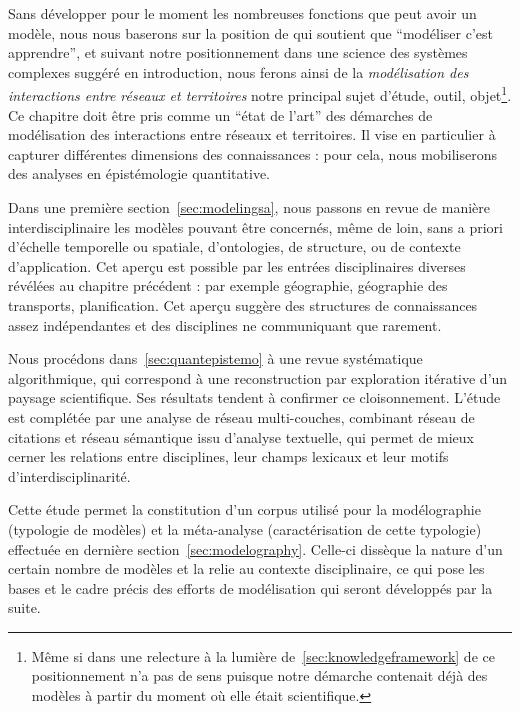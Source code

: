 Sans développer pour le moment les nombreuses fonctions que peut avoir un modèle, nous nous baserons sur la position de  qui soutient que ``modéliser c'est apprendre'', et suivant notre positionnement dans une science des systèmes complexes suggéré en introduction, nous ferons ainsi de la \emph{modélisation des interactions entre réseaux et territoires} notre principal sujet d'étude, outil, objet\footnote{Même si dans une relecture à la lumière de~\ref{sec:knowledgeframework} de ce positionnement n'a pas de sens puisque notre démarche contenait déjà des modèles à partir du moment où elle était scientifique.}. Ce chapitre doit être pris comme un ``état de l'art'' des démarches de modélisation des interactions entre réseaux et territoires. Il vise en particulier à capturer différentes dimensions des connaissances : pour cela, nous mobiliserons des analyses en épistémologie quantitative.


Dans une première section~\ref{sec:modelingsa}, nous passons en revue de manière interdisciplinaire les modèles pouvant être concernés, même de loin, sans a priori d'échelle temporelle ou spatiale, d'ontologies, de structure, ou de contexte d'application. Cet aperçu est possible par les entrées disciplinaires diverses révélées au chapitre précédent : par exemple géographie, géographie des transports, planification. Cet aperçu suggère des structures de connaissances assez indépendantes et des disciplines ne communiquant que rarement.

Nous procédons dans~\ref{sec:quantepistemo} à une revue systématique algorithmique, qui correspond à une reconstruction par exploration itérative d'un paysage scientifique. Ses résultats tendent à confirmer ce cloisonnement. L'étude est complétée par une analyse de réseau multi-couches, combinant réseau de citations et réseau sémantique issu d'analyse textuelle, qui permet de mieux cerner les relations entre disciplines, leur champs lexicaux et leur motifs d'interdisciplinarité.


Cette étude permet la constitution d'un corpus utilisé pour la modélographie (typologie de modèles) et la méta-analyse (caractérisation de cette typologie) effectuée en dernière section~\ref{sec:modelography}. Celle-ci dissèque la nature d'un certain nombre de modèles et la relie au contexte disciplinaire, ce qui pose les bases et le cadre précis des efforts de modélisation qui seront développés par la suite.







